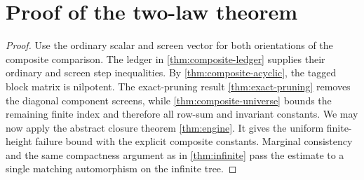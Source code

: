 \section{Proof of the two-law theorem}

\begin{proof}
\leanok
{}
Use the ordinary scalar and screen vector for both orientations of the composite comparison. The
ledger in \cref{thm:composite-ledger} supplies their ordinary and screen step inequalities. By
\cref{thm:composite-acyclic}, the tagged block matrix is nilpotent. The exact-pruning result
\cref{thm:exact-pruning} removes the diagonal component screens, while
\cref{thm:composite-universe} bounds the remaining finite index and therefore all row-sum and
invariant constants. We may now apply the abstract closure theorem \cref{thm:engine}. It gives the
uniform finite-height failure bound with the explicit composite constants. Marginal consistency
and the same compactness argument as in \cref{thm:infinite} pass the estimate to a single matching
automorphism on the infinite tree.
\end{proof}
